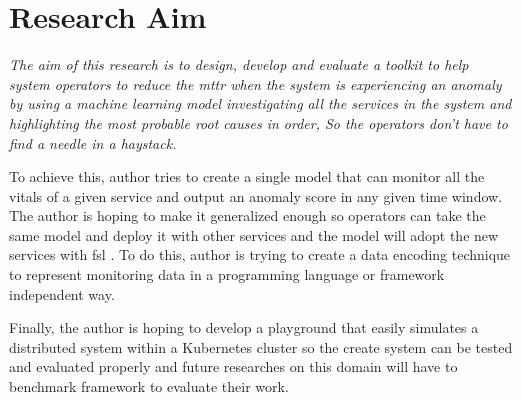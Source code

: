 \section{Research Aim}

\textit{The aim of this research is to design, develop and evaluate a toolkit to help system operators to reduce the \ac{mttr} when the system is experiencing an anomaly by using a machine learning model investigating all the services in the system and highlighting the most probable root causes in order, So the operators don't have to find a needle in a haystack.}

To achieve this, author tries to create a single model that can monitor all the vitals of a given service and output an anomaly score in any given time window. The author is hoping to make it generalized enough so operators can take the same model and deploy it with other services and the model will adopt the new services with \ac{fsl} \citep{wang2020generalizing}. To do this, author is trying to create a data encoding technique to represent monitoring data in a programming language or framework independent way.

Finally, the author is hoping to develop a playground that easily simulates a distributed system within a Kubernetes cluster so the create system can be tested and evaluated properly and future researches on this domain will have to benchmark framework to evaluate their work.
